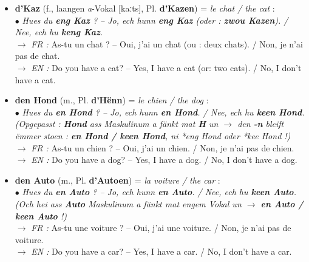 \begin{itemize}
    \item \textbf{d'Kaz} (f., laangen \textit{a}-Vokal {[kaːts]}, Pl. \textbf{d'Kazen}) = \textit{le chat / the cat} : \\
    $\bullet$ \textit{Hues du \textbf{eng Kaz} ? -- Jo, ech hunn \textbf{eng Kaz} (oder : \textbf{zwou Kazen}). / Nee, ech hu \textbf{keng Kaz}.} \\
    $\rightarrow$ \textit{FR :} As-tu un chat ? -- Oui, j'ai un chat (ou : deux chats). / Non, je n'ai pas de chat. \\
    $\rightarrow$ \textit{EN :} Do you have a cat? -- Yes, I have a cat (or: two cats). / No, I don't have a cat.
    \item \textbf{den Hond} (m., Pl. \textbf{d'Hënn}) = \textit{le chien / the dog} : \\
    $\bullet$ \textit{Hues du \textbf{en Hond} ? -- Jo, ech hunn \textbf{en Hond}. / Nee, ech hu \textbf{keen Hond}.} \\
    \textit{(Opgepasst : \textbf{Hond} ass Maskulinum a fänkt mat \textbf{H} un $\rightarrow$ den \textbf{-n} bleift ëmmer stoen : \textbf{en Hond / keen Hond}, ni \textit{*eng Hond} oder \textit{*kee Hond} !)} \\
    $\rightarrow$ \textit{FR :} As-tu un chien ? -- Oui, j'ai un chien. / Non, je n'ai pas de chien. \\
    $\rightarrow$ \textit{EN :} Do you have a dog? -- Yes, I have a dog. / No, I don't have a dog.
    \item \textbf{den Auto} (m., Pl. \textbf{d'Autoen}) = \textit{la voiture / the car} : \\
    $\bullet$ \textit{Hues du \textbf{en Auto} ? -- Jo, ech hunn \textbf{en Auto}. / Nee, ech hu \textbf{keen Auto}.} \\
    \textit{(Och hei ass \textbf{Auto} Maskulinum a fänkt mat engem Vokal un $\rightarrow$ \textbf{en Auto / keen Auto} !)} \\
    $\rightarrow$ \textit{FR :} As-tu une voiture ? -- Oui, j'ai une voiture. / Non, je n'ai pas de voiture. \\
    $\rightarrow$ \textit{EN :} Do you have a car? -- Yes, I have a car. / No, I don't have a car.
\end{itemize}

\vspace{1.5em}

